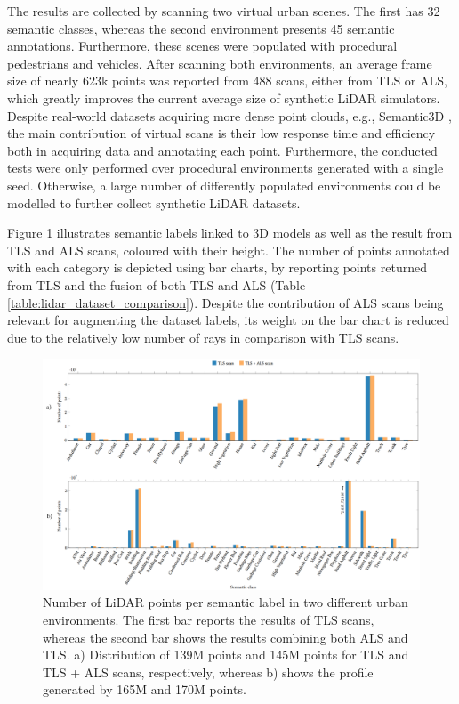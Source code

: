 The results are collected by scanning two virtual urban scenes. The first has 32 semantic classes, whereas the second environment presents 45 semantic annotations. Furthermore, these scenes were populated with procedural pedestrians and vehicles. After scanning both environments, an average frame size of nearly 623k points was reported from 488 scans, either from TLS or ALS, which greatly improves the current average size of synthetic LiDAR simulators. Despite real-world datasets acquiring more dense point clouds, e.g., Semantic3D \cite{hackel_semantic3d_2017}, the main contribution of virtual scans is their low response time and efficiency both in acquiring data and annotating each point. Furthermore, the conducted tests were only performed over procedural environments generated with a single seed. Otherwise, a large number of differently populated environments could be modelled to further collect synthetic LiDAR datasets.

Figure \ref{fig:semantic_histogram} illustrates semantic labels linked to 3D models as well as the result from TLS and ALS scans, coloured with their height. The number of points annotated with each category is depicted using bar charts, by reporting points returned from TLS and the fusion of both TLS and ALS (Table \ref{table:lidar_dataset_comparison}). Despite the contribution of ALS scans being relevant for augmenting the dataset labels, its weight on the bar chart is reduced due to the relatively low number of rays in comparison with TLS scans.

\begin{figure}
    \centering
    \includegraphics[width=\linewidth]{figs/lidar_simulation/bar_chart_annotations.png}
	\caption{Number of LiDAR points per semantic label in two different urban environments. The first bar reports the results of TLS scans, whereas the second bar shows the results combining both ALS and TLS. a) Distribution of 139M points and 145M points for TLS and TLS + ALS scans, respectively, whereas b) shows the profile generated by 165M and 170M points. }
	\label{fig:semantic_histogram}
\end{figure}

